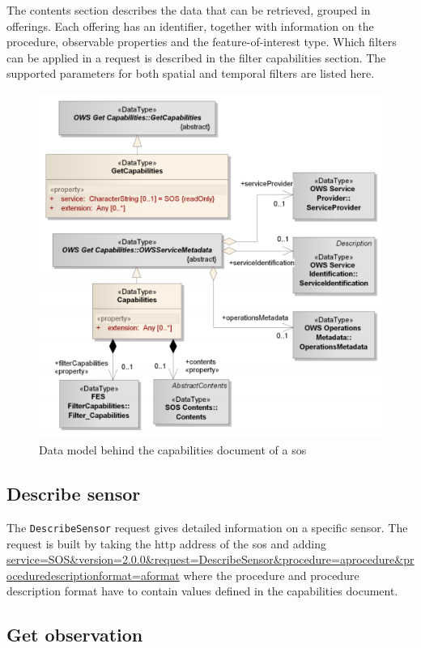 The contents section describes the data that can be retrieved, grouped in offerings. Each offering has an identifier, together with information on the procedure, observable properties and the feature-of-interest type. Which filters can be applied in a request is described in the filter capabilities section. The supported parameters for both spatial and temporal filters are listed here.

\begin{figure}
	\includegraphics[width=0.7\linewidth]{figs/SOS_2_dataModel_GetCapabilities.PNG}
	\caption{Data model behind the capabilities document of a \ac{sos} \citep{SW:OGC2}}
	\label{fig:Capabilities}
\end{figure}

\subsection{Describe sensor}

\begin{sloppypar}
The \texttt{DescribeSensor} request gives detailed information on a specific sensor. The request is built by taking the \ac{http} address of the \ac{sos} and adding \url{service=SOS\&version=2.0.0\&request=DescribeSensor\&procedure=aprocedure\&proceduredescriptionformat=aformat} where the procedure and procedure description format have to contain values defined in the capabilities document.
\end{sloppypar}

\subsection{Get observation}

